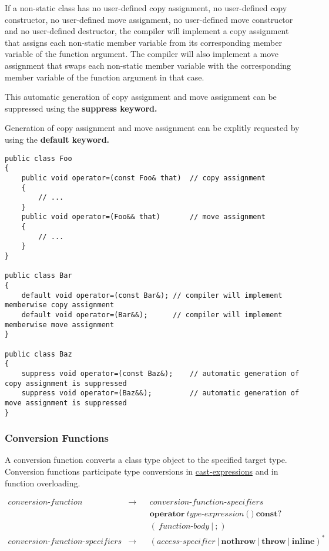 \documentclass[a4paper,oneside,11pt]{article}
\begin{document}
If a non-static class has no user-defined copy assignment, no user-defined copy constructor,
no user-defined move assignment, no user-defined move constructor and no user-defined destructor,
the compiler will implement a copy assignment that assigns each non-static member variable
from its corresponding member variable of the function argument.
The compiler will also implement a move assignment that swaps each non-static member variable
with the corresponding member variable of the function argument in that case.

This automatic generation of copy assignment and move assignment can be suppressed using the
\bf{suppress} keyword.

Generation of copy assignment and move assignment can be explitly requested by using the \bf{default} keyword.

\begin{lstlisting}[frame=trBL]
public class Foo
{
    public void operator=(const Foo& that)  // copy assignment
    {
        // ...
    }
    public void operator=(Foo&& that)       // move assignment
    {
        // ...
    }
}

public class Bar
{
    default void operator=(const Bar&); // compiler will implement memberwise copy assignment
    default void operator=(Bar&&);      // compiler will implement memberwise move assignment
}

public class Baz
{
    suppress void operator=(const Baz&);    // automatic generation of copy assignment is suppressed
    suppress void operator=(Baz&&);         // automatic generation of move assignment is suppressed
}
\end{lstlisting}

\subsubsection{Conversion Functions}\label{sec:conversionfunctions}\label{conversionfunction}

A conversion function converts a class type object to the specified target type.
Conversion functions participate type conversions in \hyperref[cast]{cast\textrm{-}expressions} and in function overloading.

\begin{align*}
conversion\textrm{-}function &\rightarrow & &conversion\textrm{-}function\textrm{-}specifiers\\
& & &\textbf{operator} \>
\hyperref[typeexpr]{type\textrm{-}expression} \> \texttt{(} \> \texttt{)} \> \textbf{const}?\\
& & &(\> \hyperref[functionbody]{function\textrm{-}body} \> | \> \texttt{;} \>)\\
conversion\textrm{-}function\textrm{-}specifiers &\rightarrow & &(\hyperref[accessspecifier]{access\textrm{-}specifier} \> | \> \textbf{nothrow} \> | \>
\textbf{throw} \> | \> \textbf{inline})^*
\end{align*}
\end{document}
